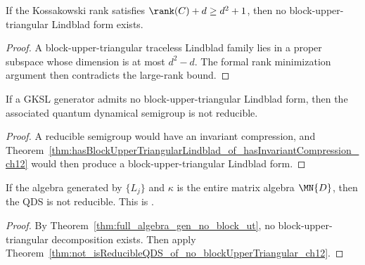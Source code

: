 \begin{theorem}
    \label{thm:large_kossakowski_rank_no_block_ut_ch12}
    \leanok
    If the Kossakowski rank satisfies $\rank(C)+d\ge d^2+1$, then no
    block-upper-triangular Lindblad form exists.
\end{theorem}

\begin{proof}
    \leanok
    A block-upper-triangular traceless Lindblad family lies in a proper subspace whose dimension is
    at most $d^2-d$. The formal rank minimization argument then contradicts the large-rank bound.
\end{proof}

\begin{theorem}
    \label{thm:not_isReducibleQDS_of_no_blockUpperTriangular_ch12}
    \leanok
    If a GKSL generator admits no block-upper-triangular Lindblad form, then the associated
    quantum dynamical semigroup is not reducible.
\end{theorem}

\begin{proof}
    \leanok
    A reducible semigroup would have an invariant compression, and
    Theorem~\ref{thm:hasBlockUpperTriangularLindblad_of_hasInvariantCompression_ch12}
    would then produce a block-upper-triangular Lindblad form.
\end{proof}

\begin{theorem}
    \label{thm:not_isReducible_of_generates_full_algebra}
    \leanok
    If the algebra generated by $\{L_j\}$ and $\kappa$ is the entire
    matrix algebra $\MN{D}$, then the QDS is not reducible.
    This is \cite[Corollary~7.2(1)]{Wolf2012Quantum}.
\end{theorem}

\begin{proof}\leanok
    By Theorem~\ref{thm:full_algebra_gen_no_block_ut}, no block-upper-triangular
    decomposition exists. Then apply
    Theorem~\ref{thm:not_isReducibleQDS_of_no_blockUpperTriangular_ch12}.
\end{proof}

